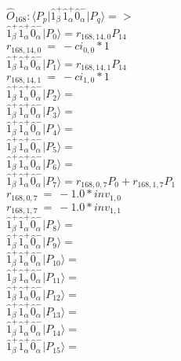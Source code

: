 \documentclass[14pt]{article}
\begin{document}
    $\hat{O}_{168}:  \langle{P_p}\vert \hat{1}_{\beta}^{+}\hat{1}_{\alpha}^{+}\hat{0}_{\alpha}^{-} \vert{P_q}\rangle => $ \\ 
    $ \hat{1}_{\beta}^{+}\hat{1}_{\alpha}^{+}\hat{0}_{\alpha}^{-} \vert{P_{0}}\rangle = {r}_{168,14,0}P_{14} $ \\ 
    ${r}_{168,14,0}\ =\ -{ci}_{0,0}*1 $ \\ 
    $ \hat{1}_{\beta}^{+}\hat{1}_{\alpha}^{+}\hat{0}_{\alpha}^{-} \vert{P_{1}}\rangle = {r}_{168,14,1}P_{14} $ \\ 
    ${r}_{168,14,1}\ =\ -{ci}_{1,0}*1 $ \\ 
    $ \hat{1}_{\beta}^{+}\hat{1}_{\alpha}^{+}\hat{0}_{\alpha}^{-} \vert{P_{2}}\rangle =  $ \\ 
    $ \hat{1}_{\beta}^{+}\hat{1}_{\alpha}^{+}\hat{0}_{\alpha}^{-} \vert{P_{3}}\rangle =  $ \\ 
    $ \hat{1}_{\beta}^{+}\hat{1}_{\alpha}^{+}\hat{0}_{\alpha}^{-} \vert{P_{4}}\rangle =  $ \\ 
    $ \hat{1}_{\beta}^{+}\hat{1}_{\alpha}^{+}\hat{0}_{\alpha}^{-} \vert{P_{5}}\rangle =  $ \\ 
    $ \hat{1}_{\beta}^{+}\hat{1}_{\alpha}^{+}\hat{0}_{\alpha}^{-} \vert{P_{6}}\rangle =  $ \\ 
    $ \hat{1}_{\beta}^{+}\hat{1}_{\alpha}^{+}\hat{0}_{\alpha}^{-} \vert{P_{7}}\rangle = {r}_{168,0,7}P_{0}+{r}_{168,1,7}P_{1} $ \\ 
    ${r}_{168,0,7}\ =\ -1.0*{inv}_{1,0} $ \\ 
    ${r}_{168,1,7}\ =\ -1.0*{inv}_{1,1} $ \\ 
    $ \hat{1}_{\beta}^{+}\hat{1}_{\alpha}^{+}\hat{0}_{\alpha}^{-} \vert{P_{8}}\rangle =  $ \\ 
    $ \hat{1}_{\beta}^{+}\hat{1}_{\alpha}^{+}\hat{0}_{\alpha}^{-} \vert{P_{9}}\rangle =  $ \\ 
    $ \hat{1}_{\beta}^{+}\hat{1}_{\alpha}^{+}\hat{0}_{\alpha}^{-} \vert{P_{10}}\rangle =  $ \\ 
    $ \hat{1}_{\beta}^{+}\hat{1}_{\alpha}^{+}\hat{0}_{\alpha}^{-} \vert{P_{11}}\rangle =  $ \\ 
    $ \hat{1}_{\beta}^{+}\hat{1}_{\alpha}^{+}\hat{0}_{\alpha}^{-} \vert{P_{12}}\rangle =  $ \\ 
    $ \hat{1}_{\beta}^{+}\hat{1}_{\alpha}^{+}\hat{0}_{\alpha}^{-} \vert{P_{13}}\rangle =  $ \\ 
    $ \hat{1}_{\beta}^{+}\hat{1}_{\alpha}^{+}\hat{0}_{\alpha}^{-} \vert{P_{14}}\rangle =  $ \\ 
    $ \hat{1}_{\beta}^{+}\hat{1}_{\alpha}^{+}\hat{0}_{\alpha}^{-} \vert{P_{15}}\rangle =  $ \\ 
    
\end{document}
